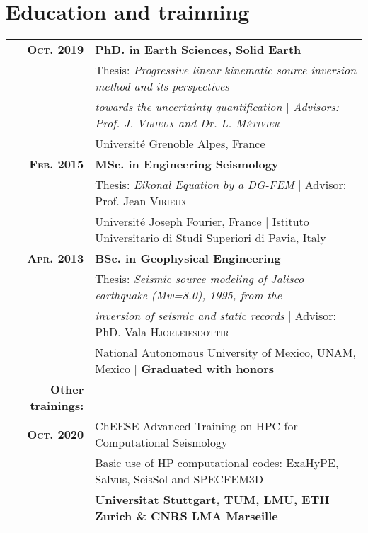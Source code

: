 \documentclass[a4paper,10.5pt]{article} %
\begin{document}
\vskip 0.5cm
\section{Education and trainning}

\begin{tabular}{rl}	
{\bf \textsc{Oct.} 2019} & {\bf PhD. in Earth Sciences, Solid Earth} \\
& Thesis: \emph{Progressive linear kinematic source inversion method and its perspectives} \\
& \emph{towards the uncertainty quantification $|$ \small Advisors: Prof. J. \textsc{Virieux} and Dr. L. \textsc{M\'etivier}}\\
& \small{Universit\'e Grenoble Alpes, France}\\[0.6em]


{\bf \textsc{Feb.} 2015} & {\bf MSc. in Engineering Seismology} \\
& Thesis: \emph{Eikonal Equation by a DG-FEM} $|$ \small Advisor: Prof. Jean \textsc{Virieux}\\
& \small{Universit\'e Joseph Fourier, France $|$ Istituto Universitario di Studi Superiori di Pavia, Italy}\\[0.6em]

{\bf \textsc{Apr.} 2013} & {\bf BSc. in Geophysical Engineering} \\
& Thesis: \emph{Seismic source modeling of Jalisco earthquake (Mw=8.0), 1995, from the} \\
& \emph{inversion of seismic and static records} $|$ \small Advisor: PhD. Vala \textsc{Hjorleifsdottir}\\
& \small{National Autonomous University of Mexico, UNAM, Mexico} $|$ \bf{Graduated with honors} \\[0.8em]

{\bf Other trainings:}\\[0.6em]
{\bf \textsc{Oct.} 2020} & ChEESE Advanced Training on HPC for Computational Seismology \\
& Basic use of HP computational codes: ExaHyPE, Salvus, SeisSol and SPECFEM3D \\
& \small\textbf{Universitat Stuttgart, TUM, LMU, ETH Zurich \& CNRS LMA Marseille}\\[0.6em]


\end{tabular}
\end{document}
